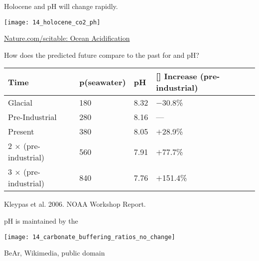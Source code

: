 \documentclass[t]{beamer}
\begin{document}
\begin{frame}[t]{Holocene  and pH will change rapidly.}

	\texttt{[image: 14\_holocene\_co2\_ph]}
	
	\vfilll
	
	\hfill \tiny \href{https://www.nature.com/scitable/knowledge/library/ocean-acidification-25822734}{Nature.com/scitable: Ocean Acidification}

\end{frame}
%
\begin{frame}[t]{How does the predicted future compare to the past for  and pH?}

	{\centering\liningnums\begin{tabular}{@{}L{25mm}C{20mm}C{10mm}R{25mm}@{}}
		\toprule
		Time	&	p\newline (seawater) &	pH	&	[] Increase (pre-industrial) \\
		\midrule
		Glacial	&	180	& 8.32	&	$-$30.8\% \\[1ex]
		Pre-Industrial	&	280	&	8.16	&	— \\[1ex]
		Present	&	380	&	8.05	&	$+$28.9\% \\[1ex]
		2 $\times$  (pre-industrial)	&	560	&	7.91	&	$+$77.7\% \\[1ex]
		3 $\times$  (pre-industrial) & 	840	& 7.76 & $+$151.4\% \\[1ex]
		\bottomrule
	\end{tabular}\par
	}

	\hangpara {} 
	\vfilll

	\hfill \tiny Kleypas et al. 2006. NOAA Workshop Report.

\end{frame}
%
\begin{frame}[t]{pH is maintained by the }

	\texttt{[image: 14\_carbonate\_buffering\_ratios\_no\_change]}
	

	\vfilll
	
	\hfill \tiny BeAr, Wikimedia, public domain
\end{frame}
%
\end{document}
